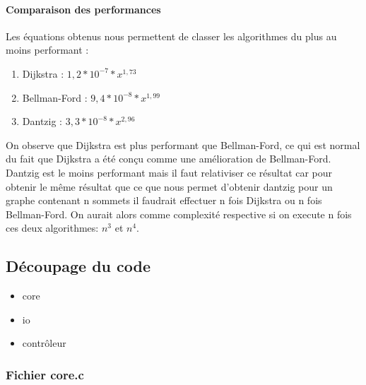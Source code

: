 \documentclass[a4paper,12pt,final] {article}
\begin{document}
\paragraph{Comparaison des performances}
Les équations obtenus nous permettent de classer les algorithmes du plus au moins performant :
\begin{enumerate}
\item Dijkstra :  $1,2*10^{-7}*x^{1,73}$
\item Bellman-Ford :  $9,4*10^{-8}*x^{1,99}$
\item Dantzig : $3,3*10^{-8}*x^{2,96}$
\end{enumerate}
On observe que Dijkstra est plus performant que Bellman-Ford, ce qui est normal du fait que Dijkstra a été con\c cu comme une amélioration de Bellman-Ford.\\
Dantzig est le moins performant mais il faut relativiser ce résultat car pour obtenir le même résultat que ce que nous permet d'obtenir dantzig pour un graphe contenant n sommets il faudrait effectuer n fois Dijkstra ou n fois Bellman-Ford. On aurait alors comme complexité respective si on execute n fois ces deux algorithmes: $n^{3}$ et $n^{4}$.
\subsection{Découpage du code}

\begin{itemize}
\item{core}
\item{io}
\item{contrôleur}
\end{itemize}


\subsubsection{Fichier core.c}

\end{document}
